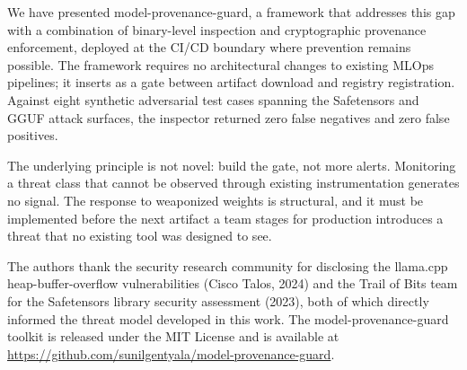 \documentclass[sigconf,review]{acmart}
\begin{document}
We have presented model-provenance-guard, a framework that addresses this
gap with a combination of binary-level inspection and cryptographic
provenance enforcement, deployed at the CI/CD boundary where prevention
remains possible. The framework requires no architectural changes to
existing MLOps pipelines; it inserts as a gate between artifact download
and registry registration. Against eight synthetic adversarial test cases
spanning the Safetensors and GGUF attack surfaces, the inspector returned
zero false negatives and zero false positives.

The underlying principle is not novel: build the gate, not more alerts.
Monitoring a threat class that cannot be observed through existing
instrumentation generates no signal. The response to weaponized weights is
structural, and it must be implemented before the next artifact a team
stages for production introduces a threat that no existing tool was designed
to see.

\begin{acks}
The authors thank the security research community for disclosing the
llama.cpp heap-buffer-overflow vulnerabilities (Cisco Talos, 2024) and the
Trail of Bits team for the Safetensors library security assessment (2023),
both of which directly informed the threat model developed in this work.
The model-provenance-guard toolkit is released under the MIT License and
is available at \url{https://github.com/sunilgentyala/model-provenance-guard}.
\end{acks}

\balance


\end{document}
